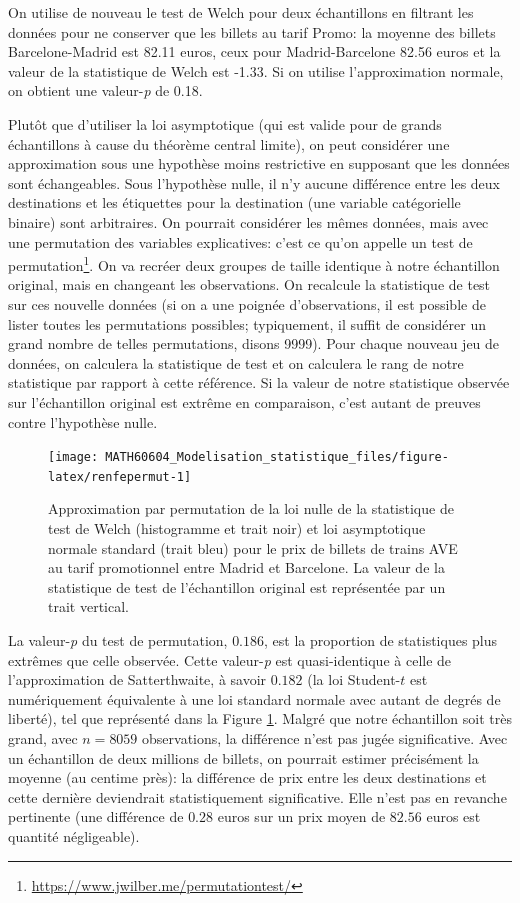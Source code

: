 \documentclass[
  11pt,
  letterpaper,
]{article}
\renewcommand{\href}[2]{#2\footnote{\url{#1}}}
\theoremstyle{definition}
\theoremstyle{definition}
\theoremstyle{definition}
\theoremstyle{definition}
\theoremstyle{remark}
\begin{document}
On utilise de nouveau le test de Welch pour deux échantillons en filtrant les données pour ne conserver que les billets au tarif Promo: la moyenne des billets Barcelone-Madrid est 82.11 euros, ceux pour Madrid-Barcelone 82.56 euros et la valeur de la statistique de Welch est -1.33. Si on utilise l'approximation normale, on obtient une valeur-\emph{p} de 0.18.

Plutôt que d'utiliser la loi asymptotique (qui est valide pour de grands échantillons à cause du théorème central limite), on peut considérer une approximation sous une hypothèse moins restrictive en supposant que les données sont échangeables. Sous l'hypothèse nulle, il n'y aucune différence entre les deux destinations et les étiquettes pour la destination (une variable catégorielle binaire) sont arbitraires. On pourrait considérer les mêmes données, mais avec une permutation des variables explicatives: c'est ce qu'on appelle un \href{https://www.jwilber.me/permutationtest/}{test de permutation}. On va recréer deux groupes de taille identique à notre échantillon original, mais en changeant les observations. On recalcule la statistique de test sur ces nouvelle données (si on a une poignée d'observations, il est possible de lister toutes les permutations possibles; typiquement, il suffit de considérer un grand nombre de telles permutations, disons 9999). Pour chaque nouveau jeu de données, on calculera la statistique de test et on calculera le rang de notre statistique par rapport à cette référence. Si la valeur de notre statistique observée sur l'échantillon original est extrême en comparaison, c'est autant de preuves contre l'hypothèse nulle.

\begin{figure}

{\centering \texttt{[image: MATH60604\_Modelisation\_statistique\_files/figure-latex/renfepermut-1]} 

}

\caption{Approximation par permutation de la loi nulle de la statistique de test de Welch (histogramme et trait noir) et loi asymptotique normale standard (trait bleu) pour le prix de billets de trains AVE au tarif promotionnel entre Madrid et Barcelone. La valeur de la statistique de test de l'échantillon original est représentée par un trait vertical.}\label{fig:renfepermut}
\end{figure}

La valeur-\emph{p} du test de permutation, \(0.186\), est la proportion de statistiques plus extrêmes que celle observée. Cette valeur-\emph{p} est quasi-identique à celle de l'approximation de Satterthwaite, à savoir \(0.182\) (la loi Student-\(t\) est numériquement équivalente à une loi standard normale avec autant de degrés de liberté), tel que représenté dans la Figure \ref{fig:renfepermut}. Malgré que notre échantillon soit très grand, avec \(n=8059\) observations, la différence n'est pas jugée significative. Avec un échantillon de deux millions de billets, on pourrait estimer précisément la moyenne (au centime près): la différence de prix entre les deux destinations et cette dernière deviendrait statistiquement significative. Elle n'est pas en revanche pertinente (une différence de \(0.28\) euros sur un prix moyen de \(82.56\) euros est quantité négligeable).
\end{document}
